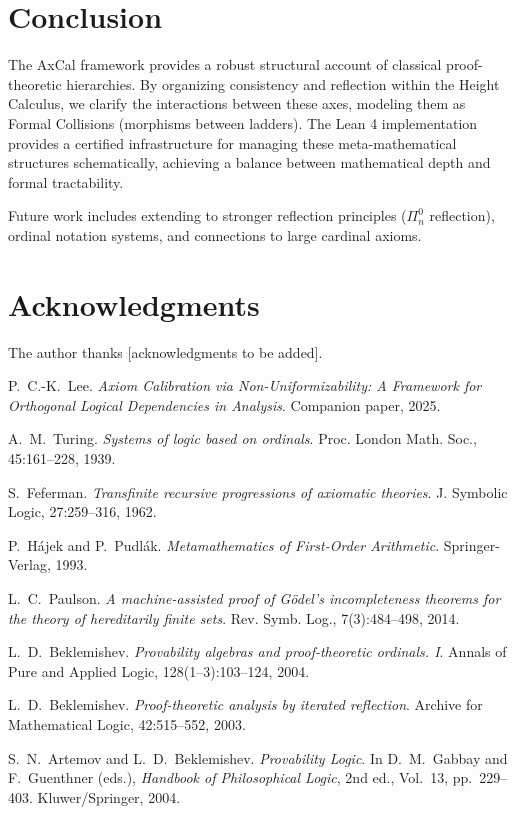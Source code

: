 \documentclass[11pt]{article}
\begin{document}
\section{Conclusion}
The AxCal framework provides a robust structural account of classical proof-theoretic hierarchies. By organizing consistency and reflection within the Height Calculus, we clarify the interactions between these axes, modeling them as Formal Collisions (morphisms between ladders). The Lean 4 implementation provides a certified infrastructure for managing these meta-mathematical structures schematically, achieving a balance between mathematical depth and formal tractability.

Future work includes extending to stronger reflection principles ($\Pi^0_n$ reflection), ordinal notation systems, and connections to large cardinal axioms.

\section*{Acknowledgments}

The author thanks [acknowledgments to be added].

\begin{thebibliography}{10}

P.~C.-K.~Lee.
\emph{Axiom Calibration via Non-Uniformizability: A Framework for Orthogonal Logical Dependencies in Analysis}.
Companion paper, 2025.

A.~M.~Turing.
\emph{Systems of logic based on ordinals}.
Proc. London Math. Soc., 45:161--228, 1939.

S.~Feferman.
\emph{Transfinite recursive progressions of axiomatic theories}.
J. Symbolic Logic, 27:259--316, 1962.

P.~Hájek and P.~Pudlák.
\emph{Metamathematics of First-Order Arithmetic}.
Springer-Verlag, 1993.

L.~C.~Paulson.
\emph{A machine-assisted proof of Gödel's incompleteness theorems for the theory of hereditarily finite sets}.
Rev. Symb. Log., 7(3):484--498, 2014.

L.~D.~Beklemishev.
\emph{Provability algebras and proof-theoretic ordinals. I}.
Annals of Pure and Applied Logic, 128(1--3):103--124, 2004.

L.~D.~Beklemishev.
\emph{Proof-theoretic analysis by iterated reflection}.
Archive for Mathematical Logic, 42:515--552, 2003.

S.~N.~Artemov and L.~D.~Beklemishev.
\emph{Provability Logic}.
In D.~M.~Gabbay and F.~Guenthner (eds.), \emph{Handbook of Philosophical Logic}, 2nd ed., Vol.~13, pp.~229--403.
Kluwer/Springer, 2004.

\end{thebibliography}
\end{document}
